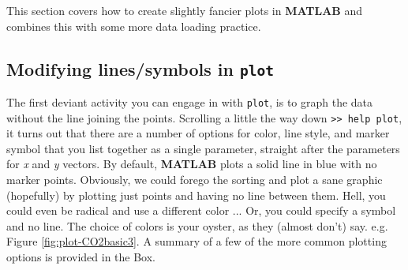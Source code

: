 \documentclass{tufte-book} %
\begin{document}
This section covers how to create slightly fancier plots in \textbf{MATLAB} and combines this with some more data loading practice.


\subsection{Modifying lines/symbols in \texttt{plot}}

The first deviant activity you can engage in with \texttt{plot}, is to graph the data without the line joining the points. Scrolling a little the way down \texttt{>> help plot}, it turns out that there are a number of options for color, line style, and marker symbol that you list together as a single parameter, straight after the parameters for \textit{x} and \textit{y} vectors. By default, \textbf{MATLAB} plots a solid line in blue with no marker points. Obviously, we could forego the sorting and plot a sane graphic (hopefully) by plotting just points and having no line between them. Hell, you could even be radical and use a different color ... Or, you could specify a symbol and no line.  The choice of colors is your oyster, as they (almost don't) say. e.g. Figure \ref{fig:plot-CO2basic3}. A summary of a few of the more common plotting options is provided in the Box. 
\end{document}

